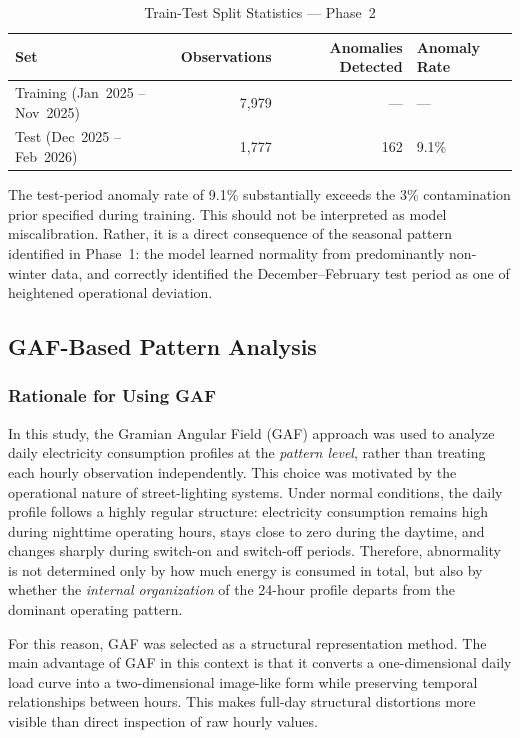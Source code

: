 \documentclass{article}
\begin{document}
\begin{table}[h]
\centering
\caption{Train-Test Split Statistics --- Phase~2}
\label{tab:split}
\begin{tabular}{lrrl}
\hline
\textbf{Set} & \textbf{Observations} & \textbf{Anomalies Detected} & \textbf{Anomaly Rate} \\
\hline
Training (Jan~2025 -- Nov~2025) & 7{,}979 & --- & --- \\
Test     (Dec~2025 -- Feb~2026) & 1{,}777 & 162 & 9.1\% \\
\hline
\end{tabular}
\end{table}

The test-period anomaly rate of 9.1\% substantially exceeds the 3\% contamination prior specified during training. This should not be interpreted as model miscalibration. Rather, it is a direct consequence of the seasonal pattern identified in Phase~1: the model learned normality from predominantly non-winter data, and correctly identified the December--February test period as one of heightened operational deviation.


\subsection{GAF-Based Pattern Analysis}

\subsubsection{Rationale for Using GAF}

In this study, the Gramian Angular Field (GAF) approach was used to analyze daily electricity consumption profiles at the \emph{pattern level}, rather than treating each hourly observation independently. This choice was motivated by the operational nature of street-lighting systems. Under normal conditions, the daily profile follows a highly regular structure: electricity consumption remains high during nighttime operating hours, stays close to zero during the daytime, and changes sharply during switch-on and switch-off periods. Therefore, abnormality is not determined only by how much energy is consumed in total, but also by whether the \emph{internal organization} of the 24-hour profile departs from the dominant operating pattern.

For this reason, GAF was selected as a structural representation method. The main advantage of GAF in this context is that it converts a one-dimensional daily load curve into a two-dimensional image-like form while preserving temporal relationships between hours. This makes full-day structural distortions more visible than direct inspection of raw hourly values.
\end{document}
